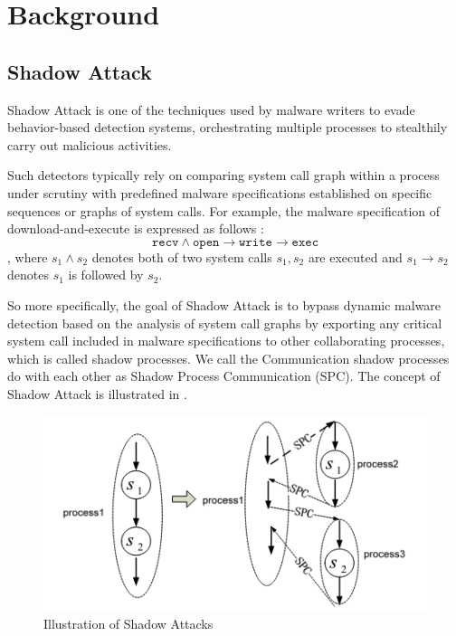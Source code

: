 \section{Background}
\subsection{Shadow Attack \cite{Weiqin:ShadowAttack}}
Shadow Attack is one of the techniques used by malware writers to evade behavior-based detection systems,
orchestrating multiple processes to stealthily carry out malicious activities.

Such detectors typically rely on comparing system call graph within a process under scrutiny with predefined
malware specifications established on specific sequences or graphs of system calls\cite{inproceedings}.
For example, the malware specification of download-and-execute is expressed as follows \cite{Weiqin:ShadowAttack}:
\begin{equation}
  \texttt{recv} \land \texttt{open} \rightarrow \texttt{write} \rightarrow \texttt{exec}
\end{equation}
, where $s_1 \land s_2$ denotes both of two system calls $s_1, s_2$ are executed and $s_1 \rightarrow s_2$
denotes $s_1$ is followed by $s_2$.

So more specifically, the goal of Shadow Attack is to bypass dynamic malware detection based on
the analysis of system call graphs by exporting any critical system call included in malware specifications to
other collaborating processes, which is called shadow processes.
We call the Communication shadow processes do with each other as Shadow Process Communication (SPC).
The concept of Shadow Attack is illustrated in .
\begin{figure}[tp]
  \begin{center}
    \includegraphics[width=\columnwidth]{./img/archi_SA.png}
  \end{center}
  \caption{Illustration of Shadow Attacks
    \cite{Weiqin:ShadowAttack}}
  \label{img:shadow-attack}
\end{figure}

